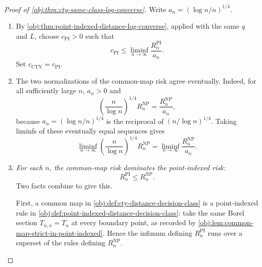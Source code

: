 \begin{proof}[Proof of \cref{obj:thm:cty-same-class-log-converse}]
Write \(a_n=(\log n/n)^{1/4}\).
\begin{enumerate}
\item By \cref{obj:thm:point-indexed-distance-log-converse}, applied with the same \(q\) and \(L\), choose \(c_{\mathrm{PI}}>0\) such that
\[
c_{\mathrm{PI}}
\leq
\liminf_{n\to\infty}\frac{R_n^{\mathrm{PI}}}{a_n}.
\]
Set \(c_{\mathrm{CTY}}=c_{\mathrm{PI}}\).

\item The two normalizations of the common-map risk agree eventually. Indeed, for all sufficiently large \(n\), \(a_n>0\) and
\[
\left(\frac{n}{\log n}\right)^{1/4}R_n^{\mathrm{NP}}
=
\frac{R_n^{\mathrm{NP}}}{a_n},
\]
because \(a_n=(\log n/n)^{1/4}\) is the reciprocal of \((n/\log n)^{1/4}\).  Taking liminfs of these eventually equal sequences gives
\[
\liminf_{n\to\infty}
\left(\frac{n}{\log n}\right)^{1/4}R_n^{\mathrm{NP}}
=
\liminf_{n\to\infty}\frac{R_n^{\mathrm{NP}}}{a_n}.
\]

\item \emph{For each \(n\), the common-map risk dominates the point-indexed risk:}
\[
R_n^{\mathrm{PI}}\leq R_n^{\mathrm{NP}}.
\]
Two facts combine to give this.

First, a common map in \cref{obj:def:cty-distance-decision-class} is a point-indexed rule in \cref{obj:def:point-indexed-distance-decision-class}: take the same Borel section \(T_{n,x}=T_n\) at every boundary point, as recorded by \cref{obj:lem:common-map-strict-in-point-indexed}.  Hence the infimum defining \(R_n^{\mathrm{PI}}\) runs over a superset of the rules defining \(R_n^{\mathrm{NP}}\).


\end{enumerate}
\end{proof}
